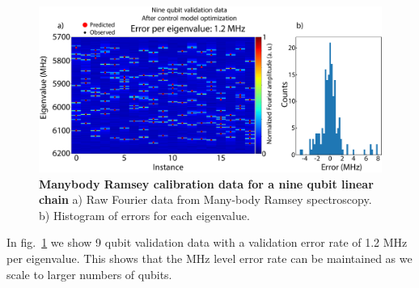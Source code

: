 \begin{figure}[h]
    \begin{center}
        \includegraphics[width=150 mm]{./PDF/mbr_9q_validation.pdf}
    \end{center}
        \caption{\textbf{Manybody Ramsey calibration data for a nine qubit linear chain}
        a) Raw Fourier data from Many-body Ramsey spectroscopy.  b) Histogram of errors for each eigenvalue.
        }
    \label{9q manybody ramsey validation}
\end{figure}
In fig.~\ref{9q manybody ramsey validation} we show 9 qubit validation data with a validation error rate of 1.2 MHz per eigenvalue.
This shows that the MHz level error rate can be maintained as we scale to larger numbers of qubits.


